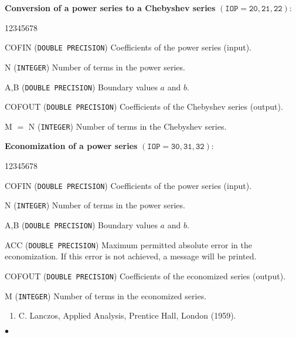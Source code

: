 {\bf Conversion of a power series to a Chebyshev series}
$(\mathtt{IOP = 20, 21, 22})$:
\begin{DLtt}{12345678}
\item[COFIN] ({\tt DOUBLE PRECISION}) Coefficients of the power
series (input).
\item[N] ({\tt INTEGER}) Number of terms in the power series.
\item[A,B] ({\tt DOUBLE PRECISION}) Boundary values $a$ and $b$.
\item[COFOUT] ({\tt DOUBLE PRECISION}) Coefficients of the Chebyshev
series (output).
\item[M $=$ N] ({\tt INTEGER}) Number of terms in the Chebyshev series.
\end{DLtt}
\newpage
{\bf Economization of a power series} $(\mathtt{IOP = 30, 31, 32})$:
\begin{DLtt}{12345678}
\item[COFIN] ({\tt DOUBLE PRECISION}) Coefficients of the power
series (input).
\item[N] ({\tt INTEGER}) Number of terms in the power series.
\item[A,B] ({\tt DOUBLE PRECISION}) Boundary values $a$ and $b$.
\item[ACC] ({\tt DOUBLE PRECISION}) Maximum permitted absolute error
in the economization. If this error is not achieved,
a message will be printed.
\item[COFOUT] ({\tt DOUBLE PRECISION}) Coefficients of the economized
series (output).
\item[M] ({\tt INTEGER}) Number of terms in the economized series.
\end{DLtt}
\Refer
\begin{enumerate}
\item C. Lanczos, Applied Analysis, Prentice Hall, London (1959).
\end{enumerate}
$\bullet$
